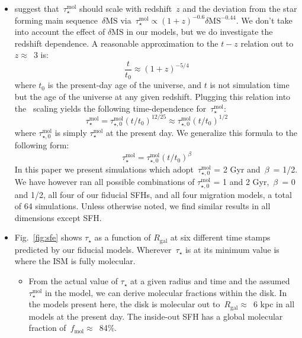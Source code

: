 \documentclass[a4paper, fleqn, usenatbib, useAMS]{mnras}
\begin{document}
\begin{itemize}
	\item \citet{Tacconi2018} suggest that~$\tau_\star^\text{mol}$ should 
	scale with redshift~$z$ and the deviation from the star forming main 
	sequence~$\delta\text{MS}$ via~$\tau_\star^\text{mol} \propto (1 + z)^{-0.6} 
	\delta\text{MS}^{-0.44}$. We don't take into account the effect of 
	$\delta\text{MS}$ in our models, but we do investigate the redshift 
	dependence. A reasonable approximation to the $t-z$ relation out 
	to~$z \approx$~3 is: 
	\begin{equation} 
	\frac{t}{t_0} \approx (1 + z)^{-5/4} 
	\end{equation} 
	where $t_0$ is the present-day age of the universe, and $t$ is not 
	simulation time but the age of the universe at any given redshift. 
	Plugging this relation into the~\citet{Tacconi2018} scaling yields the 
	following time-dependence for~$\tau_\star^\text{mol}$: 
	\begin{equation} 
	\tau_\star^\text{mol} = \tau_{\star,0}^\text{mol}(t/t_0)^{12/25} \approx 
	\tau_{\star,0}^\text{mol}(t/t_0)^{1/2} 
	\end{equation} 
	where $\tau_{\star,0}^\text{mol}$ is simply $\tau_\star^\text{mol}$ at the 
	present day. We generalize this formula to the following form: 
	\begin{equation} 
	\tau_\star^\text{mol} = \tau_{\star,0}^\text{mol}(t/t_0)^\beta 
	\end{equation} 
	In this paper we present simulations which adopt~$\tau_{\star,0}^\text{mol}$ 
	= 2 Gyr and~$\beta$~= 1/2. We have however ran all possible combinations of 
	$\tau_{\star,0}^\text{mol}$ = 1 and 2 Gyr,~$\beta$~= 0 and 1/2, all four 
	of our fiducial SFHs, and all four migration models, a total of 64 
	simulations. Unless otherwise noted, we find similar results in all 
	dimensions except SFH. 

	\item Fig.~\ref{fig:sfe} shows $\tau_\star$ as a function of $R_\text{gal}$ 
	at six different time stamps predicted by our fiducial models. 
	Wherever~$\tau_\star$ is at its minimum value is where the ISM is fully 
	molecular. 
	\begin{itemize} 
		\item From the actual value of $\tau_\star$ at a given radius and time 
		and the assumed $\tau_\star^\text{mol}$ in the model, we can derive 
		molecular fractions within the disk. In the models present here, 
		the disk is molecular out to~$R_\text{gal} \approx$~6 kpc in all models 
		at the present day. The inside-out SFH has a global molecular fraction 
		of~$f_\text{mol} \approx$~84\%. 
	\end{itemize} 
\end{itemize} 
\end{document}
